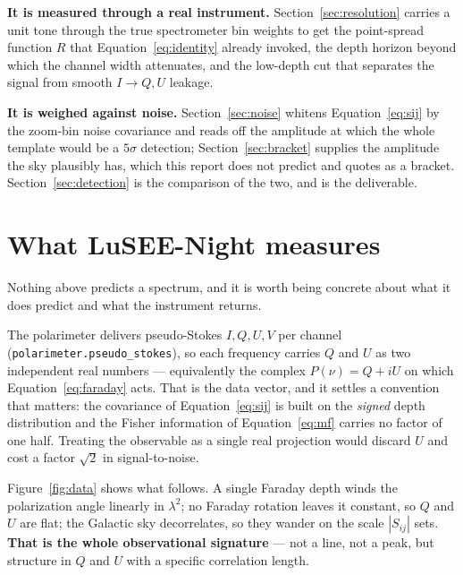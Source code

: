 \documentclass[11pt]{article}
\newcommand{\lamsq}{\ensuremath{\lambda^{2}}}
\newcommand{\code}[1]{\texttt{#1}}
\begin{document}
\textbf{It is measured through a real instrument.}
Section~\ref{sec:resolution} carries a unit tone through the true
spectrometer bin weights to get the point-spread function $R$ that
Equation~\eqref{eq:identity} already invoked, the depth horizon beyond
which the channel width attenuates, and the low-depth cut that
separates the signal from smooth $I\!\to\!Q,U$ leakage.

\textbf{It is weighed against noise.} Section~\ref{sec:noise} whitens
Equation~\eqref{eq:sij} by the zoom-bin noise covariance and reads off
the amplitude at which the whole template would be a $5\sigma$
detection; Section~\ref{sec:bracket} supplies the amplitude the sky
plausibly has, which this report does not predict and quotes as a
bracket. Section~\ref{sec:detection} is the comparison of the two, and
is the deliverable.

\section{What LuSEE-Night measures}
\label{sec:data}

Nothing above predicts a spectrum, and it is worth being concrete about
what it does predict and what the instrument returns.

The polarimeter delivers pseudo-Stokes $I,Q,U,V$ per channel
(\code{polarimeter.pseudo\_stokes}), so each frequency carries $Q$ and
$U$ as two independent real numbers --- equivalently the complex
$P(\nu) = Q + iU$ on which Equation~\eqref{eq:faraday} acts. That is
the data vector, and it settles a convention that matters: the
covariance of Equation~\eqref{eq:sij} is built on the \emph{signed}
depth distribution and the Fisher information of
Equation~\eqref{eq:mf} carries no factor of one half. Treating the
observable as a single real projection would discard $U$ and cost a
factor $\sqrt2$ in signal-to-noise.

Figure~\ref{fig:data} shows what follows. A single Faraday depth winds
the polarization angle linearly in \lamsq; no Faraday rotation leaves
it constant, so $Q$ and $U$ are flat; the Galactic sky decorrelates,
so they wander on the scale $|S_{ij}|$ sets. \textbf{That is the whole
observational signature} --- not a line, not a peak, but structure in
$Q$ and $U$ with a specific correlation length.
\end{document}
